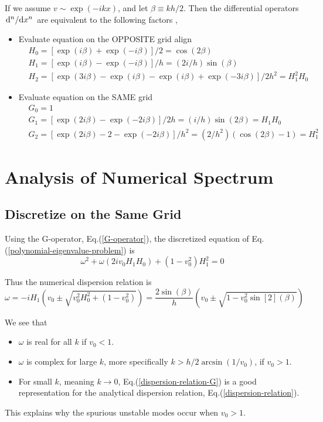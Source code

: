 \documentclass{article}
\begin{document}
If we assume $v\sim \exp(-ikx)$, and let $\beta\equiv kh/2$. Then the differential operators $\dv*[n]{x}$ are equivalent to the following factors \cite{LLOBET1990199},
\begin{itemize}
    \item Evaluate equation on the OPPOSITE grid
    align
    \begin{align}
        &H_0 = [\exp(i\beta)+\exp(-i\beta)]/2 = \cos(2\beta) \nonumber \\
        &H_1 = [\exp(i\beta)-\exp(-i\beta)]/h = (2i/h)\sin(\beta) 
        \label{H-operator} \\
        &H_2 = [\exp(3i\beta)-\exp(i\beta)-\exp(i\beta)+\exp(-3i\beta)]/2h^2 = H_1^2H_0 \nonumber 
    \end{align}

    \item Evaluate equation on the SAME grid
    \begin{align}
        &G_0 = 1 \nonumber \\
        &G_1 = [\exp(2i\beta)-\exp(-2i\beta)]/2h = (i/h)\sin(2\beta) = H_1H_0 
        \label{G-operator}\\
        &G_2 = [\exp(2i\beta)-2-\exp(-2i\beta)]/h^2 = (2/h^2)(\cos(2\beta)-1) = H_1^2 \nonumber 
    \end{align}
\end{itemize}


\section{Analysis of Numerical Spectrum}
\subsection{Discretize on the Same Grid}
Using the G-operator, Eq.(\ref{G-operator}), the discretized equation of Eq.(\ref{polynomial-eigenvalue-problem}) is 
\[ \omega^2 + \omega(2iv_0H_1H_0) + (1-v_0^2)H_1^2 = 0 \]

Thus the numerical dispersion relation is
\begin{equation} \label{dispersion-relation-G}
    \omega = -iH_1 \left(v_0 \pm \sqrt{v_0^2H_0^2 + (1-v_0^2)}\right) = \frac{2\sin(\beta)}{h}\left(v_0 \pm \sqrt{1 - v_0^2\sin[2](\beta)}\right)
\end{equation}

We see that 
\begin{itemize}
    \item $\omega$ is real for all $k$ if $v_0 < 1$.
    \item $\omega$ is complex for large $k$, more specifically $k>h/2\arcsin(1/v_0)$, if $v_0 > 1$.
    \item For small $k$, meaning $k\to 0$, Eq.(\ref{dispersion-relation-G}) is a good representation for the analytical dispersion relation, Eq.(\ref{dispersion-relation}). 
\end{itemize}
This explains why the spurious unstable modes occur when $v_0>1$.
\end{document}
